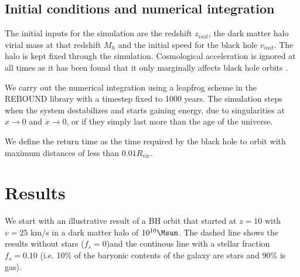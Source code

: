 \documentclass[fleqn,usenatbib]{mnras}
\begin{document}
\subsection{Initial conditions and numerical integration}

The initial inputs for the simulation are the redshift $z_{init}$, the dark matter halo virial mass at that redshift $M_{h}$ and the initial speed for the black hole $v_{init}$. 
The halo is kept fixed through the simulation. Cosmological acceleration is ignored at all times as it has been found that it only marginally affects black hole orbits \citep{choksi2017recoiling}. 

We carry out the numerical integration  using a leapfrog scheme in the REBOUND library with a timestep fixed to 1000 years.
The simulation steps when the system destabilizes and starts gaining energy, due to singularities at $x \rightarrow 0$ and $\dot{x} \rightarrow 0$, or if they simply last more than the age of the universe. 
		
We define the return time as the time required by the black hole to orbit with maximum distances of less than  $0.01R_\text{vir}$.
		

\section{Results}

We start with an illustrative result of a BH orbit that started at $z=10$ with $v=25$ km/s in a dark matter halo of $10^{10}\Msun$.
The dashed line shows the results without stars ($f_s=0$)and the continous line with a stellar fraction $f_s=0.10$ (i.e. 10\% of the baryonic contents of the galaxy are stars and $90\%$ is gas).








\appendix

\bsp	%
\label{lastpage}
\end{document}
